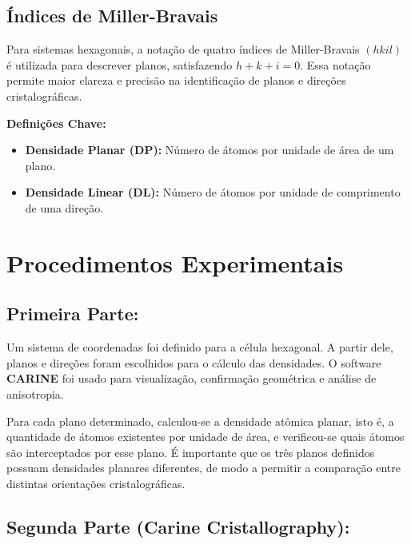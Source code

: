 \documentclass[10pt,twocolumn,letterpaper]{article}
\begin{document}
\subsection{Índices de Miller-Bravais}
\hspace{1cm} Para sistemas hexagonais, a notação de quatro índices de Miller-Bravais \((hkil)\) é utilizada para descrever planos, satisfazendo \(h+k+i=0\). Essa notação permite maior clareza e precisão na identificação de planos e direções cristalográficas.

\begin{mdframed}
\textbf{\color{primaryBlue}Definições Chave:}
\begin{itemize}
    \item \textbf{Densidade Planar (DP):} Número de átomos por unidade de área de um plano.
    \item \textbf{Densidade Linear (DL):} Número de átomos por unidade de comprimento de uma direção.
\end{itemize}
\end{mdframed}

\section{Procedimentos Experimentais}
\subsection{Primeira Parte:}
\hspace{1cm} Um sistema de coordenadas foi definido para a célula hexagonal. A partir dele, planos e direções foram escolhidos para o cálculo das densidades. O software \textbf{CARINE} foi usado para visualização, confirmação geométrica e análise de anisotropia. 

\hspace{1cm} Para cada plano determinado, calculou-se a densidade atômica planar, isto é, a quantidade de átomos existentes por unidade de área, e verificou-se quais átomos são interceptados por esse plano. É importante que os três planos definidos possuam densidades planares diferentes, de modo a permitir a comparação entre distintas orientações cristalográficas.
\subsection{Segunda Parte (\textbf{Carine Cristallography}):}
\end{document}
